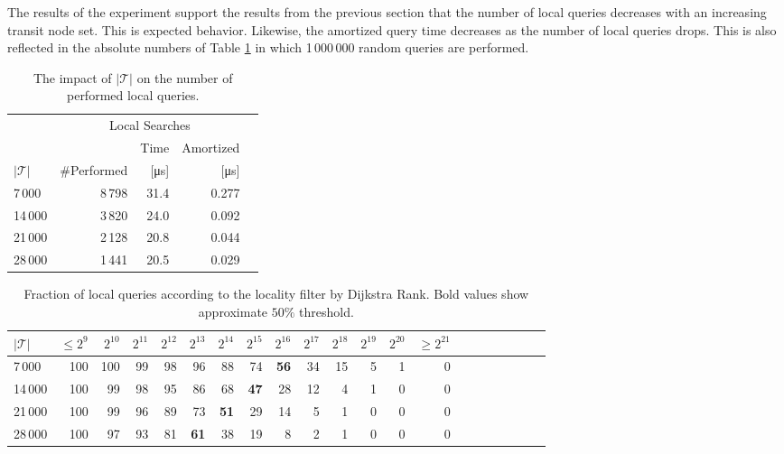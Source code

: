 \documentclass{llncs}
\begin{document}
The results of the experiment support the results from the previous section that the number of local queries decreases with an increasing transit node set.
This is expected behavior.
Likewise, the amortized query time decreases as the number of local queries drops.
This is also reflected in the absolute numbers of Table \ref{tab:LocalQueries} in which 1\,000\,000 random queries are performed.
\begin{table}[b]
\caption{The impact of $\vert\mathcal{T}\vert$ on the number of performed local queries.}
\label{tab:LocalQueries}
\centering
\begin{tabular}{lrrrr}
\toprule
				& \multicolumn{3}{c}{Local Searches} \\
\cmidrule{2-4}
	&				& Time					& Amortized \\					
$\vert\mathcal{T}\vert$	& \#Performed 	& [\si{\micro\second}] 	& [\si{\micro\second}] \\ 	
\midrule
7\,000 & 8\,798 & 31.4 & 0.277 \\
14\,000 & 3\,820 & 24.0 & 0.092 \\
21\,000 & 2\,128 & 20.8 & 0.044 \\
28\,000 & 1\,441 & 20.5 & 0.029 \\
\bottomrule 
\end{tabular}
\end{table}

\begin{table}[h]
\caption{Fraction of local queries according to the locality filter by Dijkstra Rank. Bold values show approximate $50\%$ threshold.}
\label{tab:filterByRank}
\centering
\begin{tabular}{lrrrrrrrrrrrrrrrrrrrr}
\toprule 
$\vert\mathcal{T}\vert$ & $\leq 2^9$ & $2^{10}$ & $2^{11}$ & $2^{12}$ & $2^{13}$ & $2^{14}$ & $2^{15}$ & $2^{16}$ & $2^{17}$ & $2^{18}$ & $2^{19}$ & $2^{20}$ & $\geq 2^{21}$ \\ 
\midrule
7\,000 & 100 & 100 & 99 & 98 & 96 & 88 & 74 & \textbf{56} & 34 & 15 & 5 & 1 & 0 \\
14\,000 & 100 & 99 & 98 & 95 & 86 & 68 & \textbf{47} & 28 & 12 & 4 & 1 & 0 & 0 \\
21\,000 & 100 & 99 & 96 & 89 & 73 & \textbf{51} & 29 & 14 & 5 & 1 & 0 & 0 & 0 \\
28\,000 & 100 & 97 & 93 & 81 & \textbf{61} & 38 & 19 & 8 & 2 & 1 & 0 & 0 & 0 \\
\bottomrule 
\end{tabular}
\end{table}
\end{document}
